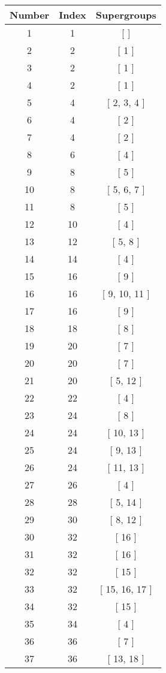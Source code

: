 \begin{center}
\begin{longtable}[H]{|| c c c ||}
\hline
Number &  Index &  Supergroups
\\\hline
1 & 1 & [  ]
\\\hline
2 & 2 & [ 1 ]
\\\hline
3 & 2 & [ 1 ]
\\\hline
4 & 2 & [ 1 ]
\\\hline
5 & 4 & [ 2, 3, 4 ]
\\\hline
6 & 4 & [ 2 ]
\\\hline
7 & 4 & [ 2 ]
\\\hline
8 & 6 & [ 4 ]
\\\hline
9 & 8 & [ 5 ]
\\\hline
10 & 8 & [ 5, 6, 7 ]
\\\hline
11 & 8 & [ 5 ]
\\\hline
12 & 10 & [ 4 ]
\\\hline
13 & 12 & [ 5, 8 ]
\\\hline
14 & 14 & [ 4 ]
\\\hline
15 & 16 & [ 9 ]
\\\hline
16 & 16 & [ 9, 10, 11 ]
\\\hline
17 & 16 & [ 9 ]
\\\hline
18 & 18 & [ 8 ]
\\\hline
19 & 20 & [ 7 ]
\\\hline
20 & 20 & [ 7 ]
\\\hline
21 & 20 & [ 5, 12 ]
\\\hline
22 & 22 & [ 4 ]
\\\hline
23 & 24 & [ 8 ]
\\\hline
24 & 24 & [ 10, 13 ]
\\\hline
25 & 24 & [ 9, 13 ]
\\\hline
26 & 24 & [ 11, 13 ]
\\\hline
27 & 26 & [ 4 ]
\\\hline
28 & 28 & [ 5, 14 ]
\\\hline
29 & 30 & [ 8, 12 ]
\\\hline
30 & 32 & [ 16 ]
\\\hline
31 & 32 & [ 16 ]
\\\hline
32 & 32 & [ 15 ]
\\\hline
33 & 32 & [ 15, 16, 17 ]
\\\hline
34 & 32 & [ 15 ]
\\\hline
35 & 34 & [ 4 ]
\\\hline
36 & 36 & [ 7 ]
\\\hline
37 & 36 & [ 13, 18 ]

\end{longtable}
\end{center}

